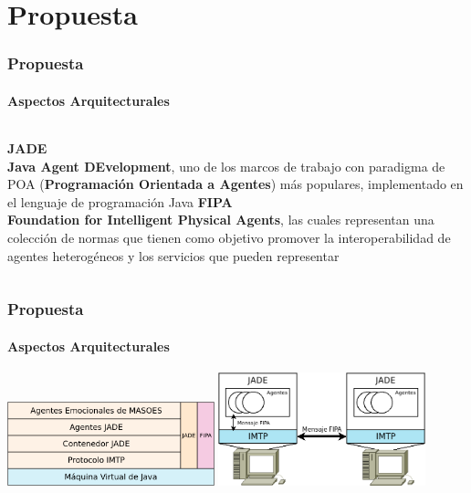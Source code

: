\documentclass{beamer}
\begin{document}
\section{Propuesta}

\begin{frame}
\frametitle{Propuesta}
\framesubtitle{Aspectos Arquitecturales}
\begin{columns}
\textbf{JADE}\\
\textbf{Java Agent
DEvelopment}, uno de los marcos de trabajo con paradigma de POA (\textbf{Programación Orientada a Agentes})
más populares, implementado en el lenguaje de programación Java
\textbf{FIPA}\\
\textbf{Foundation for Intelligent Physical Agents},
las cuales representan una colección de normas que tienen como objetivo promover la interoperabilidad
de agentes heterogéneos y los servicios que pueden representar
\end{columns}
\end{frame}

\begin{frame}
\frametitle{Propuesta}
\framesubtitle{Aspectos Arquitecturales}
\centering
\includegraphics[width=6cm]{ilustraciones/arquitectura}
\vfill
\includegraphics[width=6cm]{ilustraciones/comunicacion-entre-hosts}
\end{frame}
\end{document}
